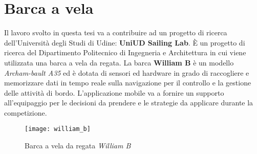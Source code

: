 \section{Barca a vela}
Il lavoro svolto in questa tesi va a contribuire ad un progetto di ricerca dell'Università degli Studi di Udine: \textbf{UniUD Sailing Lab}. È un progetto di ricerca del Dipartimento Politecnico di Ingegneria e Architettura in cui viene utilizzata una barca a vela da regata. La barca \textbf{William B} è un modello \textit{Archam-bault A35} ed è dotata di sensori ed hardware in grado di raccogliere e memorizzare dati in tempo reale sulla navigazione per il controllo e la gestione delle attività di bordo.
L'applicazione mobile va a fornire un supporto all'equipaggio per le decisioni da prendere e le strategie da applicare durante la competizione.
\begin{figure}
	\begin{center}
		\texttt{[image: william\_b]}
		\caption[Barca a vela Williab B]{Barca a vela da regata \textit{William B} \cite{william_b}}
		\label{figura:william_b}
	\end{center}
\end{figure}